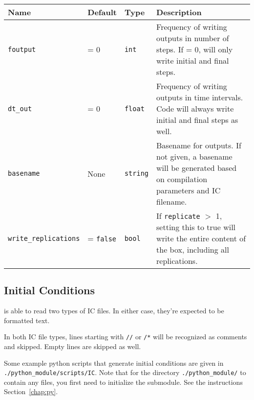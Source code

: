 \begin{tabular}[c]{p{2.5cm} p{1.5cm} p{} p{}}
Name & Default & Type & Description
\\
\hline
\hline
\texttt{foutput} &
    = 0 &
    \texttt{int} &
    Frequency of writing outputs in number of steps. If = 0, will only write
    initial and final steps.
\\ \hline
\texttt{dt\_out} &
    = 0 &
    \texttt{float} &
    Frequency of writing outputs in time intervals. Code will always write
    initial and final steps as well.
\\ \hline
\texttt{basename} &
    None &
    \texttt{string} &
    Basename for outputs. If not given, a basename will be generated based on
    compilation parameters and IC filename.
\\ \hline
\texttt{write\_replications} &
    = \texttt{false} &
    \texttt{bool} &
    If \texttt{replicate} $>$ 1, setting this to true will write the entire
    content of the box, including all replications.
\end{tabular}




















\subsection{Initial Conditions}\label{chap:icfile}



\hydro is able to read two types of IC files. In either case, they're expected
to be formatted text.

In both IC file types, lines starting with \texttt{//} or \texttt{/*} will be
recognized as comments and skipped. Empty lines are skipped as well.

Some example python scripts that generate initial conditions are given in
\verb|./python_module/scripts/IC|. Note that for the directory
\verb|./python_module/| to contain any files, you first need to initialize the
submodule. See the instructions Section~\ref{chap:py}.







